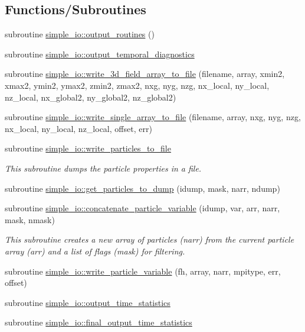 \subsection*{Functions/\+Subroutines}
\begin{DoxyCompactItemize}
\item 
subroutine \hyperlink{namespacesimple__io_afa460efbda992ca175d786f86ab09ee9}{simple\+\_\+io\+::output\+\_\+routines} ()
\item 
subroutine \hyperlink{namespacesimple__io_acb0fc119c4f9a03b88d4129ec0036e1c}{simple\+\_\+io\+::output\+\_\+temporal\+\_\+diagnostics}
\item 
subroutine \hyperlink{namespacesimple__io_a2100e8a4cfe3bc3c9e2dcc93988d6551}{simple\+\_\+io\+::write\+\_\+3d\+\_\+field\+\_\+array\+\_\+to\+\_\+file} (filename, array,                                                               xmin2, xmax2, ymin2, ymax2, zmin2, zmax2, nxg, nyg, nzg, nx\+\_\+local,                                               ny\+\_\+local, nz\+\_\+local, nx\+\_\+global2, ny\+\_\+global2, nz\+\_\+global2)
\item 
subroutine \hyperlink{namespacesimple__io_a506cc0f775048e27bb5ccd9e936592d3}{simple\+\_\+io\+::write\+\_\+single\+\_\+array\+\_\+to\+\_\+file} (filename, array, nxg, nyg, nzg, nx\+\_\+local, ny\+\_\+local, nz\+\_\+local, offset, err)
\item 
subroutine \hyperlink{namespacesimple__io_a63ed0844b45f6a3402a846a10456fdb7}{simple\+\_\+io\+::write\+\_\+particles\+\_\+to\+\_\+file}
\begin{DoxyCompactList}\small\item\em This subroutine dumps the particle properties in a file. \end{DoxyCompactList}\item 
subroutine \hyperlink{namespacesimple__io_abb3c1220ac70ea28fcbce1cd9c03b294}{simple\+\_\+io\+::get\+\_\+particles\+\_\+to\+\_\+dump} (idump, mask, narr, ndump)
\item 
subroutine \hyperlink{namespacesimple__io_a97c3b871fecd4b1341301fa6cf00a8fa}{simple\+\_\+io\+::concatenate\+\_\+particle\+\_\+variable} (idump, var, arr, narr, mask, nmask)
\begin{DoxyCompactList}\small\item\em This subroutine creates a new array of particles (narr) from the current particle array (arr) and a list of flags (mask) for filtering. \end{DoxyCompactList}\item 
subroutine \hyperlink{namespacesimple__io_aad8ee8298c20d69fabcd6eb5a8b7b620}{simple\+\_\+io\+::write\+\_\+particle\+\_\+variable} (fh, array, narr, mpitype, err, offset)
\item 
subroutine \hyperlink{namespacesimple__io_a87d8855ebcd3134e3cfaeb7f6c548249}{simple\+\_\+io\+::output\+\_\+time\+\_\+statistics}
\item 
subroutine \hyperlink{namespacesimple__io_a4f7eec6a6854f8127e7bfdfa307d7bb9}{simple\+\_\+io\+::final\+\_\+output\+\_\+time\+\_\+statistics}
\end{DoxyCompactItemize}
